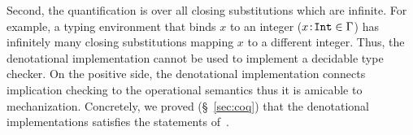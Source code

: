 Second, the quantification is over all closing substitutions
which are infinite. For example, 
a typing environment that binds $x$ to an integer 
(\ie ${{x}\!:\!{\texttt{Int}}}\in \mathrm{\Gamma}$) 
has infinitely many closing substitutions mapping $x$ to a different 
integer. Thus, the denotational implementation 
cannot be used to implement a decidable type checker. 
%
On the positive side, the denotational implementation
connects implication checking to the operational semantics
thus it is amicable to mechanization.
Concretely, we proved (\S~\ref{sec:coq})
that the denotational implementations satisfies 
the statements of~. 

